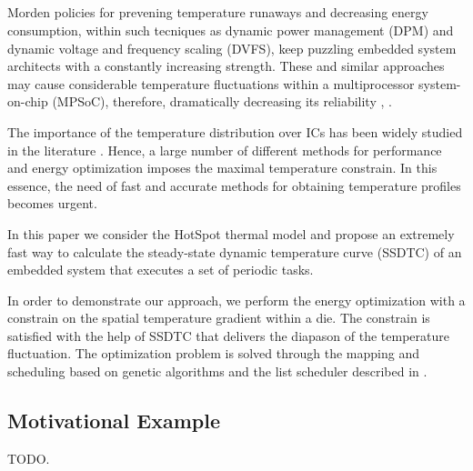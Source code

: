 \subsection{\ssdtc}
Morden policies for prevening temperature runaways and decreasing energy consumption, within such tecniques as dynamic power management (DPM) and dynamic voltage and frequency scaling (DVFS), keep puzzling embedded system architects with a constantly increasing strength. These and similar approaches may cause considerable temperature fluctuations within a multiprocessor system-on-chip (MPSoC), therefore, dramatically decreasing its reliability \cite{mihic2004}, \cite{simunic2005}.

The importance of the temperature distribution over ICs has been widely studied in the literature \cite{lu2004}. Hence, a large number of different methods for performance and energy optimization imposes the maximal temperature constrain. In this essence, the need of fast and accurate methods for obtaining temperature profiles becomes urgent.

In this paper we consider the HotSpot thermal model \cite{huang2006} and propose an extremely fast way to calculate the steady-state dynamic temperature curve (SSDTC) of an embedded system that executes a set of periodic tasks.

In order to demonstrate our approach, we perform the energy optimization with a constrain on the spatial temperature gradient within a die. The constrain is satisfied with the help of SSDTC that delivers the diapason of the temperature fluctuation. The optimization problem is solved through the mapping and scheduling based on genetic algorithms and the list scheduler described in \cite{schmitz2004}.

\subsection{Motivational Example}
TODO.

